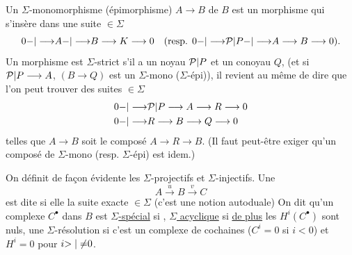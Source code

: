 Un $\Sigma$-monomorphisme (épimorphisme)
$A\longrightarrow B$ de $B$ est un morphisme qui s'insère
dans une suite $\in\Sigma$
\[
0{-|\longrightarrow}A{-|\longrightarrow}B\longrightarrow K\longrightarrow0
\quad(\text{resp. }0{-|\longrightarrow}{\mathcal P|P}{-|\longrightarrow}A\longrightarrow B\longrightarrow0).
\]
Un morphisme  est $\Sigma$-strict s'il a un
noyau ${\mathcal P|P}$ et un conoyau $Q$, 
(et si ${\mathcal P|P}\longrightarrow A$, $(B\longrightarrow Q)$ est un $\Sigma$-mono ($\Sigma$-épi)), il
revient au même de dire que l'on peut trouver
des suites $\in\Sigma$
\[
\begin{aligned}
0&{-|\longrightarrow}{\mathcal P|P}\longrightarrow A\longrightarrow R\longrightarrow0\\
0&{-|\longrightarrow}R\longrightarrow B\longrightarrow Q\longrightarrow0
\end{aligned}
\]
telles que $A\longrightarrow B$ soit le composé $A\longrightarrow R\longrightarrow B$.
(Il faut peut-être exiger qu'un composé de
$\Sigma$-mono (resp. $\Sigma$-épi) est idem.)

On définit de façon évidente les  $\Sigma$-projectifs
et $\Sigma$-injectifs. Une 
\[
A\xrightarrow{u}B\xrightarrow{v}C
\]
est dite    si elle
la suite exacte $\in\Sigma$
(c'est une notion autoduale) On dit qu'un
complexe $C^\bullet$ dans $B$ est \uline{$\Sigma$-spécial} si ,
\uline{$\Sigma$ acyclique} si \uline{de plus} les $H^i(C^\bullet)$ sont nuls,
une $\Sigma$-résolution si c'est un complexe
de cochaines ($C^i=0$ si $i<0$) et
$H^i=0$ pour $i{>|\neq}0$.

